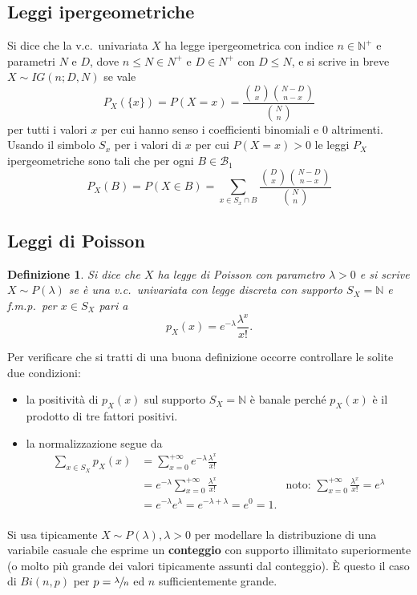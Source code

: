 \documentclass[11pt,a4paper,twoside]{article}
\newtheorem{definition}{Definizione}
\let\leq\leqslant%
\newcommand\N{\mathbb{N}}
\newcommand\B{\mathcal{B}}
\begin{document}
\subsection{Leggi ipergeometriche}
Si dice che la v.c.\ univariata \(X\) ha legge ipergeometrica con
indice \(n\in\N^+\) e parametri \(N\) e \(D\), dove \(n\leq N \in
N^+\) e \(D\in N^+\) con \(D\leq N\), e si scrive in breve \(X\sim
IG(n; D, N)\) se vale
\[
  P_X(\{x\}) = P(X=x) = \frac{{D\choose x} {N-D\choose n-x}}{{N\choose n}}
\]
per tutti i valori \(x\) per cui hanno senso i coefficienti binomiali
e 0 altrimenti.  Usando il simbolo \(S_x\) per i valori di \(x\) per
cui \(P(X = x) > 0\) le leggi \(P_X\) ipergeometriche sono tali che
per ogni \(B\in\B_1\)
\[
  P_X(B) = P(X\in B) = \sum_{x\in S_x\cap B} \frac{{D\choose x} {N-D\choose n-x}}{{N\choose n}}
\]

\subsection{Leggi di Poisson}

\begin{definition}
  Si dice che \(X\) ha legge di Poisson con parametro \(\lambda > 0\) e
  si scrive \(X\sim P(\lambda)\) se è una v.c.\ univariata con legge
  discreta con supporto \(S_X = \N\) e f.m.p.\ per \(x\in S_X\) pari a
  \[
    p_X(x) = e^{-\lambda} \frac{\lambda^x}{x!} .
  \]
\end{definition}

Per verificare che si tratti di una buona definizione occorre
controllare le solite due condizioni:
\begin{itemize}
\item la positività di \(p_X(x)\) sul supporto \(S_X = \N\) è banale
  perché \(p_X(x)\) è il prodotto di tre fattori positivi.
\item la normalizzazione segue da
  \begin{align*}
    \sum_{x\in S_X} p_X(x)
    &= \sum_{x=0}^{+\infty} e^{-\lambda}
      \frac{\lambda^x}{x!} & \\
    & = e^{-\lambda}\sum_{x=0}^{+\infty} \frac {\lambda^x}{x!} &
                           \mbox{noto: }\sum_{x=0}^{+\infty}\frac{\lambda^x}{x!} = e^{\lambda} \\
    &= e^{-\lambda}e^\lambda = e^{-\lambda + \lambda} = e^0 = 1. & \\
  \end{align*}
\end{itemize}

Si usa tipicamente \(X\sim P(\lambda), \lambda > 0\) per modellare la
distribuzione di una variabile casuale che esprime un
\textbf{conteggio} con supporto illimitato superiormente (o molto più
grande dei valori tipicamente assunti dal conteggio).  È questo il
caso di \(Bi(n,p)\) per \(p = \sfrac{\lambda}{n}\) ed \(n\)
sufficientemente grande.
\end{document}
